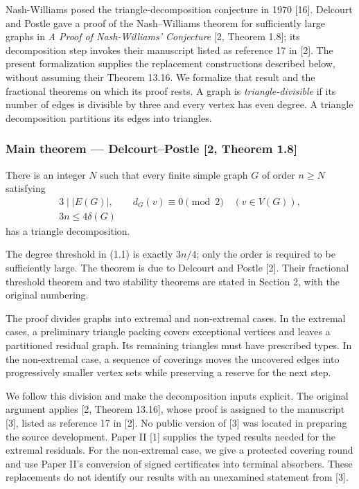 \documentclass[english,11pt,a4paper]{article}
\begin{document}
Nash-Williams posed the triangle-decomposition conjecture in 1970 {[}16{]}. Delcourt and Postle gave a proof of the Nash--Williams theorem for sufficiently large graphs in \emph{A Proof of Nash-Williams' Conjecture} {[}2, Theorem 1.8{]}; its decomposition step invokes their manuscript listed as reference 17 in {[}2{]}. The present formalization supplies the replacement constructions described below, without assuming their Theorem 13.16. We formalize that result and the fractional theorems on which its proof rests. A graph is \emph{triangle-divisible} if its number of edges is divisible by three and every vertex has even degree. A triangle decomposition partitions its edges into triangles.


\subsubsection{Main theorem --- Delcourt--Postle {[}2, Theorem 1.8{]}}\label{main-theorem-delcourtpostle-2-theorem-1.8}

There is an integer \(N\) such that every finite simple graph \(G\) of order \(n\ge N\) satisfying \[\begin{gathered}
3\mid |E(G)|,\qquad d_G(v)\equiv0\pmod2\quad(v\in V(G)),\\
3n\le4\delta(G)
\end{gathered}
\tag{1.1}\] has a triangle decomposition.

The degree threshold in (1.1) is exactly \(3n/4\); only the order is required to be sufficiently large. The theorem is due to Delcourt and Postle {[}2{]}. Their fractional threshold theorem and two stability theorems are stated in Section 2, with the original numbering.

The proof divides graphs into extremal and non-extremal cases. In the extremal cases, a preliminary triangle packing covers exceptional vertices and leaves a partitioned residual graph. Its remaining triangles must have prescribed types. In the non-extremal case, a sequence of coverings moves the uncovered edges into progressively smaller vertex sets while preserving a reserve for the next step.

We follow this division and make the decomposition inputs explicit. The original argument applies {[}2, Theorem 13.16{]}, whose proof is assigned to the manuscript {[}3{]}, listed as reference 17 in {[}2{]}. No public version of {[}3{]} was located in preparing the source development. Paper II {[}1{]} supplies the typed results needed for the extremal residuals. For the non-extremal case, we give a protected covering round and use Paper II's conversion of signed certificates into terminal absorbers. These replacements do not identify our results with an unexamined statement from {[}3{]}.
\end{document}
